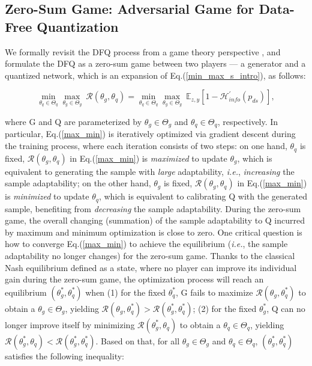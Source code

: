 \subsection{Zero-Sum Game: Adversarial Game for Data-Free Quantization}
\label{dfq_game}
We formally revisit the DFQ process from a game theory perspective \cite{li2022policy,zhang2022no}, and formulate the DFQ as a zero-sum game between two players --- a generator and a quantized network, which is an expansion of Eq.(\ref{min_max_s_intro}), as follows:
\begin{small}
\begin{equation}
\mathop{min}_{\theta_q\in \Theta_q} \mathop{max}_{\theta_g\in \Theta_g} \  \mathcal{R}(\theta_g,\theta_q)=\mathop{min}_{\theta_q\in \Theta_q} \mathop{max}_{\theta_g\in \Theta_g} \ \mathbb{E}_{z,y}[1-\mathcal{H}^{'}_{info}(p_{ds})],
\label{max_min}
\end{equation}
\end{small}
where G and Q are parameterized by $\theta_g\in \Theta_g$ and $\theta_q\in \Theta_q$, respectively. In particular, Eq.(\ref{max_min}) is iteratively optimized via gradient descent during the training process, where each iteration consists of two steps: on one hand, $\theta_q$ is fixed, $\mathcal{R}(\theta_g,\theta_q)$ in Eq.(\ref{max_min}) is \emph{maximized} to update $\theta_g$, which is equivalent to generating the sample with \emph{large} adaptability,  \emph{i.e.}, \emph{increasing} the sample adaptability; on the other hand, $\theta_g$ is fixed,  $\mathcal{R}(\theta_g,\theta_q)$ in Eq.(\ref{max_min}) is \emph{minimized} to update $\theta_q$, which is equivalent to calibrating Q with the generated sample, benefiting from \emph{decreasing} the sample adaptability. During the zero-sum game, the overall changing (summation) of the sample adaptability to Q incurred by maximum and minimum optimization is close to zero. 
One critical question is how to converge Eq.(\ref{max_min}) to achieve the equilibrium (\emph{i.e.}, the sample adaptability no longer changes) for the zero-sum game.  Thanks to the classical Nash equilibrium \cite{cardoso2019competing} defined as a state, where no player can improve its individual gain during the zero-sum game, the optimization process will reach an equilibrium $(\theta_g^*,\theta_q^*)$ when (1) for the fixed $\theta_q^*$, G fails to maximize $\mathcal{R}(\theta_g,\theta_q^*)$ to obtain a $\theta_g\in \Theta_g$, yielding $\mathcal{R}(\theta_g,\theta_q^*) > \mathcal{R}(\theta_g^*,\theta_q^*)$; (2) for the fixed $\theta_g^*$, Q can no longer improve itself by minimizing $\mathcal{R}(\theta_g^*,\theta_q)$ to obtain a $\theta_q\in \Theta_q$, yielding $\mathcal{R}(\theta_g^*,\theta_q) < \mathcal{R}(\theta_g^*,\theta_q^*)$. Based on that, for all $\theta_g\in \Theta_g$ and $\theta_q\in \Theta_q$, $(\theta_g^*,\theta_q^*)$ satisfies the following inequality:
